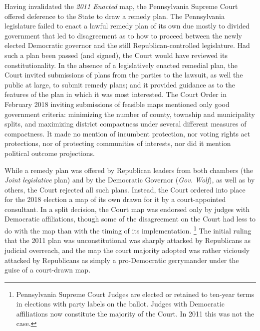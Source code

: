     Having invalidated the \textit{2011 Enacted} map, the Pennsylvania Supreme Court offered deference to the State to draw a remedy plan. The Pennsylvania legislature failed to enact a lawful remedy plan of its own due mostly to divided government that led to disagreement as to how to proceed between the newly elected Democratic governor and the still Republican-controlled legislature. Had such a plan been passed (and signed), the Court would have reviewed its constitutionality. In the absence of a legislatively enacted remedial plan, the Court invited submissions of plans from the parties to the lawsuit, as well the public at large, to submit remedy plans; and it provided guidance as to the features of the plan in which it was most interested. The Court Order in February 2018 inviting submissions of feasible maps mentioned only good government criteria: minimizing the number of county, township and municipality splits, and maximizing district compactness under several different measures of compactness. It made no mention of incumbent protection, nor voting rights act protections, nor of protecting communities of interests, nor did it mention political outcome projections.
\par
    While a remedy plan was offered by Republican leaders from both chambers (the \textit{Joint legislative} plan) and by the Democratic Governor (\textit{Gov. Wolf}), as well as by others, the Court rejected all such plans. Instead, the Court ordered into place for the 2018 election a map of its own drawn for it by a court-appointed consultant. In a split decision, the Court map was endorsed only by judges with Democratic affiliations, though some of the disagreement on the Court had less to do with the map than with the timing of its implementation.
        \footnote{Pennsylvania Supreme Court Judges are elected or retained to ten-year terms in elections with party labels on the ballot. Judges with Democratic affiliations now constitute the majority of the Court. In 2011 this was not the case.}
    The initial ruling that the 2011 plan was unconstitutional was sharply attacked by Republicans as judicial overreach, and the map the court majority adopted was rather viciously attacked by Republicans as simply a pro-Democratic gerrymander under the guise of a court-drawn map.
